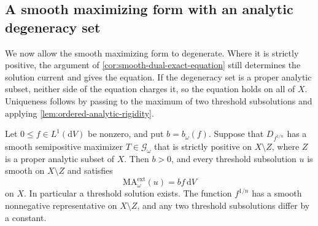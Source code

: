 \subsection{A smooth maximizing form with an analytic degeneracy set}
\label{subsec:semipositive-dual-setting}

We now allow the smooth maximizing form to degenerate. Where it is strictly positive, the argument of \cref{cor:smooth-dual-exact-equation} still determines the solution current and gives the equation. If the degeneracy set is a proper analytic subset, neither side of the equation charges it, so the equation holds on all of $X$. Uniqueness follows by passing to the maximum of two threshold subsolutions and applying \cref{lem:ordered-analytic-rigidity}.

\begin{theorem}\label{thm:semipositive-dual-exact-equation}
Let $0\leq f\in L^1(\mathrm{d}V)$ be nonzero, and put $b=b_\omega(f)$. Suppose that $D_{f^{1/n}}$ has a smooth semipositive maximizer $T\in\mathscr G_\omega$ that is strictly positive on $X\setminus Z$, where $Z$ is a proper analytic subset of $X$. Then $b>0$, and every threshold subsolution $u$ is smooth on $X\setminus Z$ and satisfies
\[
 \mathrm{MA}^{\mathrm{ext}}_\omega(u)=bf\,\mathrm{d}V
\]
on $X$. In particular a threshold solution exists. The function $f^{1/n}$ has a smooth nonnegative representative on $X\setminus Z$, and any two threshold subsolutions differ by a constant.
\end{theorem}

